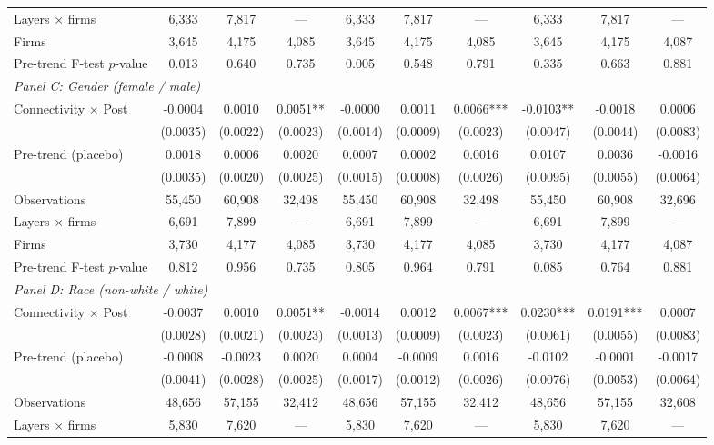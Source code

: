 \begin{table}[H]
{\begin{tabular}{lccccccccc}
\quad Layers $\times$ firms & 6,333 & 7,817 & --- & 6,333 & 7,817 & --- & 6,333 & 7,817 & --- \\
\quad Firms & 3,645 & 4,175 & 4,085 & 3,645 & 4,175 & 4,085 & 3,645 & 4,175 & 4,087 \\
\quad Pre-trend F-test $p$-value & 0.013 & 0.640 & 0.735 & 0.005 & 0.548 & 0.791 & 0.335 & 0.663 & 0.881 \\[6pt]
\multicolumn{10}{l}{\textit{Panel C: Gender (female / male)}} \\
\quad Connectivity $\times$ Post & -0.0004 & 0.0010 & 0.0051** & -0.0000 & 0.0011 & 0.0066*** & -0.0103** & -0.0018 & 0.0006 \\
 & (0.0035) & (0.0022) & (0.0023) & (0.0014) & (0.0009) & (0.0023) & (0.0047) & (0.0044) & (0.0083) \\
\quad Pre-trend (placebo) & 0.0018 & 0.0006 & 0.0020 & 0.0007 & 0.0002 & 0.0016 & 0.0107 & 0.0036 & -0.0016 \\
 & (0.0035) & (0.0020) & (0.0025) & (0.0015) & (0.0008) & (0.0026) & (0.0095) & (0.0055) & (0.0064) \\
\quad Observations & 55,450 & 60,908 & 32,498 & 55,450 & 60,908 & 32,498 & 55,450 & 60,908 & 32,696 \\
\quad Layers $\times$ firms & 6,691 & 7,899 & --- & 6,691 & 7,899 & --- & 6,691 & 7,899 & --- \\
\quad Firms & 3,730 & 4,177 & 4,085 & 3,730 & 4,177 & 4,085 & 3,730 & 4,177 & 4,087 \\
\quad Pre-trend F-test $p$-value & 0.812 & 0.956 & 0.735 & 0.805 & 0.964 & 0.791 & 0.085 & 0.764 & 0.881 \\[6pt]
\multicolumn{10}{l}{\textit{Panel D: Race (non-white / white)}} \\
\quad Connectivity $\times$ Post & -0.0037 & 0.0010 & 0.0051** & -0.0014 & 0.0012 & 0.0067*** & 0.0230*** & 0.0191*** & 0.0007 \\
 & (0.0028) & (0.0021) & (0.0023) & (0.0013) & (0.0009) & (0.0023) & (0.0061) & (0.0055) & (0.0083) \\
\quad Pre-trend (placebo) & -0.0008 & -0.0023 & 0.0020 & 0.0004 & -0.0009 & 0.0016 & -0.0102 & -0.0001 & -0.0017 \\
 & (0.0041) & (0.0028) & (0.0025) & (0.0017) & (0.0012) & (0.0026) & (0.0076) & (0.0053) & (0.0064) \\
\quad Observations & 48,656 & 57,155 & 32,412 & 48,656 & 57,155 & 32,412 & 48,656 & 57,155 & 32,608 \\
\quad Layers $\times$ firms & 5,830 & 7,620 & --- & 5,830 & 7,620 & --- & 5,830 & 7,620 & --- \\

\end{tabular}}
\end{table}

